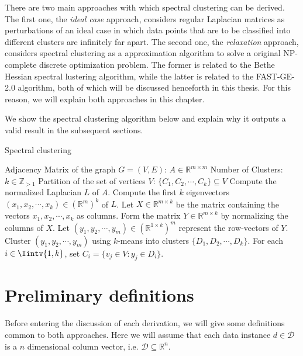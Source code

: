There are two main approaches with which spectral clustering can be derived.
The first one, the \textit{ideal case} approach, considers regular Laplacian matrices as perturbations of an ideal case in which data points that are to be classified into different clusters are infinitely far apart.
The second one, the \textit{relaxation} approach, considers spectral clustering as a approximation algorithm to solve a original NP-complete discrete optimization problem.
The former is related to the Bethe Hessian spectral lustering algorithm, while the latter is related to the FAST-GE-2.0 algorithm, both of which will be discussed henceforth in this thesis.
For this reason, we will explain both approaches in this chapter.

We show the spectral clustering algorithm below and explain why it outputs a valid result in the subsequent sections.

\begin{algorithm}
\caption{Spectral clustering}\label{spectral_clustering}
\begin{algorithmic}[1]
   \Require 
      \Statex Adjacency Matrix of the graph $G = (V,E)$: $A \in \mathbb R ^ {m \times m}$ 
      \Statex Number of Clusters: $k \in \mathbb Z_{>1}$
   \Ensure 
      \Statex Partition of the set of vertices $V$: $\{ C_1, C_2, \cdots, C_k \} \subseteq V$
      \vspace{0.2 cm}
   \State Compute the normalized Laplacian $L$ of $A$.
   \State Compute the first $k$ eigenvectors $(x_1, x_2, \cdots, x_k) \in (\mathbb R^{m})^k$ of $L$.
   \State Let $X \in \mathbb R^{m \times k}$ be the matrix containing the vectors $x_1, x_2, \cdots, x_k$ as columns.
   \State Form the matrix $Y \in \mathbb R^{m \times k}$ by normalizing the columns of $X$.
   \State Let $(y_1, y_2, \cdots, y_m) \in ( \mathbb R^{1 \times k} )^m$ represent the row-vectors of $Y$.
   \State Cluster $(y_1, y_2, \cdots, y_m)$ using $k$-means into clusters $\{ D_1, D_2, \cdots, D_k \} $.
   \State For each $i \in \Iintv{1,k}$, set $C_i = \{ v_j \in V: y_j \in D_i \}$.
\end{algorithmic}
\end{algorithm}




\section{Preliminary definitions} 
Before entering the discussion of each derivation, we will give some definitions common to both approaches.
Here we will assume that each data instance $d \in \mathcal D$ is a $n$ dimensional column vector, i.e. $\mathcal D \subseteq \mathbb R^{n }$.

